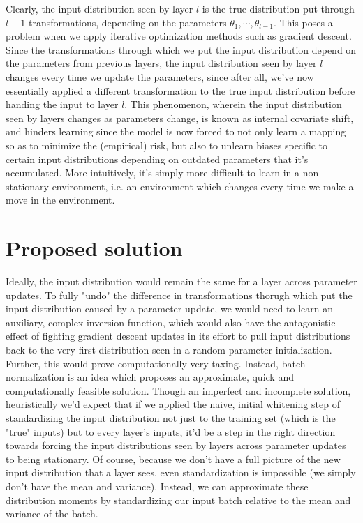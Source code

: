 \documentclass{article}
\begin{document}
Clearly, the input distribution seen by layer $ l $ is the true distribution put through $ l - 1 $ transformations, depending on the parameters $ \theta_1, \cdots, \theta_{l - 1} $. This poses a problem when we apply iterative optimization methods such as gradient descent. Since the transformations through which we put the input distribution depend on the parameters from previous layers, the input distribution seen by layer $ l $ changes every time we update the parameters, since after all, we've now essentially applied a different transformation to the true input distribution before handing the input to layer $ l $. This phenomenon, wherein the input distribution seen by layers changes as parameters change, is known as internal covariate shift, and hinders learning since the model is now forced to not only learn a mapping so as to minimize the (empirical) risk, but also to unlearn biases specific to certain input distributions depending on outdated parameters that it's accumulated. More intuitively, it's simply more difficult to learn in a non-stationary environment, i.e. an environment which changes every time we make a move in the environment.

\section{Proposed solution}
Ideally, the input distribution would remain the same for a layer across parameter updates. To fully "undo" the difference in transformations thorugh which put the input distribution caused by a parameter update, we would need to learn an auxiliary, complex inversion function, which would also have the antagonistic effect of fighting gradient descent updates in its effort to pull input distributions back to the very first distribution seen in a random parameter initialization. Further, this would prove computationally very taxing. Instead, batch normalization is an idea which proposes an approximate, quick and computationally feasible solution. Though an imperfect and incomplete solution, heuristically we'd expect that if we applied the naive, initial whitening step of standardizing the input distribution not just to the training set (which is the "true" inputs) but to every layer's inputs, it'd be a step in the right direction towards forcing the input distributions seen by layers across parameter updates to being stationary. Of course, because we don't have a full picture of the new input distribution that a layer sees, even standardization is impossible (we simply don't have the mean and variance). Instead, we can approximate these distribution moments by standardizing our input batch relative to the mean and variance of the batch.
\end{document}
